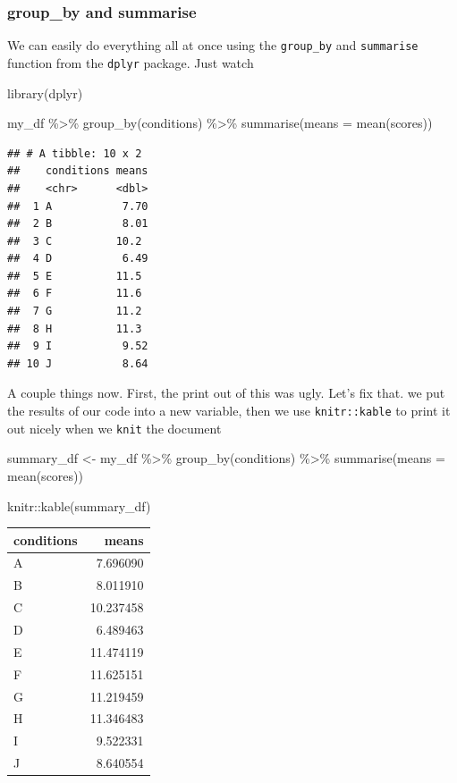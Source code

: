 \documentclass[
]{book}
\newenvironment{Shaded}{\begin{snugshade}}{\end{snugshade}}
\newcommand{\AttributeTok}[1]{\textcolor[rgb]{0.77,0.63,0.00}{#1}}
\newcommand{\FunctionTok}[1]{\textcolor[rgb]{0.00,0.00,0.00}{#1}}
\newcommand{\NormalTok}[1]{#1}
\newcommand{\OtherTok}[1]{\textcolor[rgb]{0.56,0.35,0.01}{#1}}
\newcommand{\SpecialCharTok}[1]{\textcolor[rgb]{0.00,0.00,0.00}{#1}}
\begin{document}
\hypertarget{group_by-and-summarise}{%
\subsubsection{group\_by and summarise}\label{group_by-and-summarise}}

We can easily do everything all at once using the \texttt{group\_by} and \texttt{summarise} function from the \texttt{dplyr} package. Just watch

\begin{Shaded}
\begin{Highlighting}[]
\FunctionTok{library}\NormalTok{(dplyr)}

\NormalTok{my\_df }\SpecialCharTok{\%\textgreater{}\%}
  \FunctionTok{group\_by}\NormalTok{(conditions) }\SpecialCharTok{\%\textgreater{}\%}
  \FunctionTok{summarise}\NormalTok{(}\AttributeTok{means =} \FunctionTok{mean}\NormalTok{(scores))}
\end{Highlighting}
\end{Shaded}

\begin{verbatim}
## # A tibble: 10 x 2
##    conditions means
##    <chr>      <dbl>
##  1 A           7.70
##  2 B           8.01
##  3 C          10.2 
##  4 D           6.49
##  5 E          11.5 
##  6 F          11.6 
##  7 G          11.2 
##  8 H          11.3 
##  9 I           9.52
## 10 J           8.64
\end{verbatim}

A couple things now. First, the print out of this was ugly. Let's fix that. we put the results of our code into a new variable, then we use \texttt{knitr::kable} to print it out nicely when we \texttt{knit} the document

\begin{Shaded}
\begin{Highlighting}[]
\NormalTok{summary\_df }\OtherTok{\textless{}{-}}\NormalTok{ my\_df }\SpecialCharTok{\%\textgreater{}\%}
               \FunctionTok{group\_by}\NormalTok{(conditions) }\SpecialCharTok{\%\textgreater{}\%}
               \FunctionTok{summarise}\NormalTok{(}\AttributeTok{means =} \FunctionTok{mean}\NormalTok{(scores))}

\NormalTok{knitr}\SpecialCharTok{::}\FunctionTok{kable}\NormalTok{(summary\_df)}
\end{Highlighting}
\end{Shaded}

\begin{tabular}{l|r}
\hline
conditions & means\\
\hline
A & 7.696090\\
\hline
B & 8.011910\\
\hline
C & 10.237458\\
\hline
D & 6.489463\\
\hline
E & 11.474119\\
\hline
F & 11.625151\\
\hline
G & 11.219459\\
\hline
H & 11.346483\\
\hline
I & 9.522331\\
\hline
J & 8.640554\\
\hline
\end{tabular}
\end{document}
